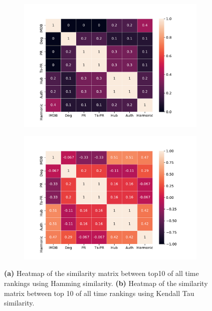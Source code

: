 \documentclass{article}
\begin{document}
\begin{figure}
     \centering
     \begin{subfigure}{0.49\textwidth}
         \centering
         \includegraphics[width=\textwidth]{hamming-heatmap.pdf}
         \subcaption[]{}
         \label{fig:hamming}
     \end{subfigure}
     \hfill
     \begin{subfigure}{0.49\textwidth}
         \centering
         \includegraphics[width=\textwidth]{kendalltau-heatmap.pdf}
         \subcaption[]{}
         \label{fig:kendalltau}
     \end{subfigure}
     \hfill
    \caption{\textbf{(a)} Heatmap of the similarity matrix between top10 of all time rankings using Hamming similarity. \textbf{(b)} Heatmap of the similarity matrix between top 10 of all time rankings using Kendall Tau similarity.}
    \label{fig:similarity}
\end{figure}
\end{document}
